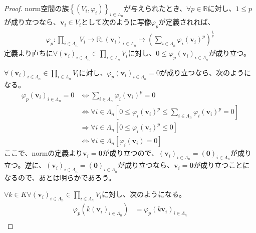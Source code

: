 \documentclass[dvipdfmx]{jsarticle}
\begin{document}
\begin{proof}
norm空間の族$\left\{ \left( V_{i},\varphi_{i} \right) \right\}_{i \in \varLambda_{n}}$が与えられたとき、$\forall p \in \mathbb{R}$に対し、$1 \leq p$が成り立つなら、$\mathbf{v}_{i} \in V_{i}$として次のように写像$\varphi_{p}$が定義されれば、
\begin{align*}
\varphi_{p}:\prod_{i \in \varLambda_{n}} V_{i} \rightarrow \mathbb{R};\left( \mathbf{v}_{i} \right)_{i \in \varLambda_{n}} \mapsto \left( \sum_{i \in \varLambda_{n}} {\varphi_{i}\left( \mathbf{v}_{i} \right)}^{p} \right)^{\frac{1}{p}}
\end{align*}
定義より直ちに$\forall\left( \mathbf{v}_{i} \right)_{i \in \varLambda_{n}} \in \prod_{i \in \varLambda_{n}} V_{i}$に対し、$0 \leq \varphi_{p}\left( \mathbf{v}_{i} \right)_{i \in \varLambda_{n}}$が成り立つ。\par
$\forall\left( \mathbf{v}_{i} \right)_{i \in \varLambda_{n}} \in \prod_{i \in \varLambda_{n}} V_{i}$に対し、$\varphi_{p}\left( \mathbf{v}_{i} \right)_{i \in \varLambda_{n}} = 0$が成り立つなら、次のようになる。
\begin{align*}
\varphi_{p}\left( \mathbf{v}_{i} \right)_{i \in \varLambda_{n}} = 0 &\Leftrightarrow \sum_{i \in \varLambda_{n}} {\varphi_{i}\left( \mathbf{v}_{i} \right)}^{p} = 0\\
&\Leftrightarrow \forall i \in \varLambda_{n}\left[ 0 \leq {\varphi_{i}\left( \mathbf{v}_{i} \right)}^{p} \leq \sum_{i \in \varLambda_{n}} {\varphi_{i}\left( \mathbf{v}_{i} \right)}^{p} = 0 \right]\\
&\Rightarrow \forall i \in \varLambda_{n}\left[ 0 \leq {\varphi_{i}\left( \mathbf{v}_{i} \right)}^{p} \leq 0 \right]\\
&\Leftrightarrow \forall i \in \varLambda_{n}\left[ \varphi_{i}\left( \mathbf{v}_{i} \right) = 0 \right]
\end{align*}
ここで、normの定義より$\mathbf{v}_{i} = \mathbf{0}$が成り立つので、$\left( \mathbf{v}_{i} \right)_{i \in \varLambda_{n}} = \left( \mathbf{0} \right)_{i \in \varLambda_{n}}$が成り立つ。逆に、$\left( \mathbf{v}_{i} \right)_{i \in \varLambda_{n}} = \left( \mathbf{0} \right)_{i \in \varLambda_{n}}$が成り立つなら、$\mathbf{v}_{i} = \mathbf{0}$が成り立つことになるので、あとは明らかであろう。\par
$\forall k \in K\forall\left( \mathbf{v}_{i} \right)_{i \in \varLambda_{n}} \in \prod_{i \in \varLambda_{n}} V_{i}$に対し、次のようになる。
\begin{align*}
\varphi_{p}\left( k\left( \mathbf{v}_{i} \right)_{i \in \varLambda_{n}} \right) &= \varphi_{p}\left( k\mathbf{v}_{i} \right)_{i \in \varLambda_{n}}\\

\end{align*}
\end{proof}
\end{document}
